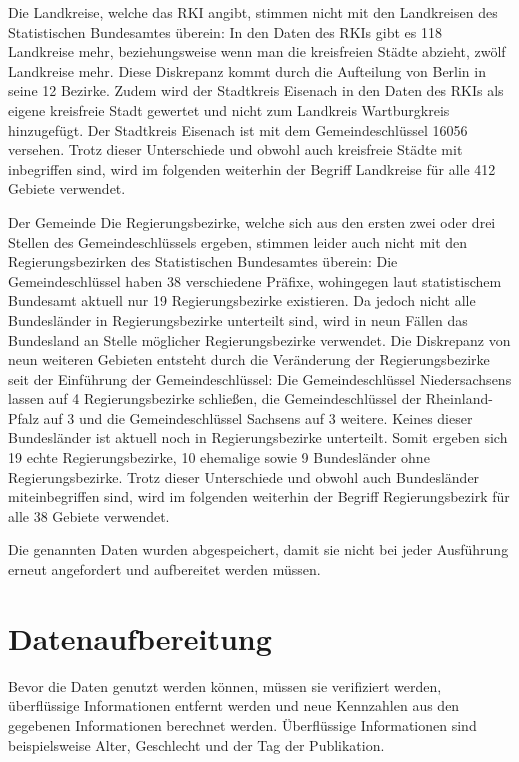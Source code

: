 Die Landkreise, welche das RKI angibt, stimmen nicht mit den Landkreisen des Statistischen Bundesamtes  \autocite{statistischesBundesamtLandkreise}
überein: In den Daten des RKIs gibt es 118 Landkreise mehr, beziehungsweise wenn man die kreisfreien Städte abzieht, zwölf Landkreise mehr. Diese Diskrepanz kommt durch die Aufteilung von Berlin in seine 12 Bezirke. Zudem wird der Stadtkreis Eisenach in den Daten des RKIs als eigene kreisfreie Stadt gewertet und nicht zum Landkreis Wartburgkreis hinzugefügt. Der Stadtkreis Eisenach ist mit dem Gemeindeschlüssel 16056 versehen. Trotz dieser Unterschiede und obwohl auch kreisfreie Städte mit inbegriffen sind, wird im folgenden weiterhin der Begriff \glqq{}Landkreise\grqq{} für alle 412 Gebiete verwendet.

Der Gemeinde
Die Regierungsbezirke, welche sich aus den ersten zwei oder drei Stellen des Gemeindeschlüssels ergeben, stimmen leider auch nicht mit den Regierungsbezirken des Statistischen Bundesamtes
\autocite{statistischesBundesamtRegierungsbezirke}
überein: Die Gemeindeschlüssel haben 38 verschiedene Präfixe, wohingegen laut statistischem Bundesamt aktuell nur 19 Regierungsbezirke existieren.
Da jedoch nicht alle Bundesländer in Regierungsbezirke unterteilt sind, wird in neun Fällen das Bundesland an Stelle möglicher Regierungsbezirke verwendet. Die Diskrepanz von neun weiteren Gebieten entsteht durch die Veränderung der Regierungsbezirke seit der Einführung der Gemeindeschlüssel: Die Gemeindeschlüssel Niedersachsens lassen auf 4 Regierungsbezirke schließen, die Gemeindeschlüssel der Rheinland-Pfalz auf 3 und die Gemeindeschlüssel Sachsens auf 3 weitere. Keines dieser Bundesländer ist aktuell noch in Regierungsbezirke unterteilt. Somit ergeben sich 19 echte Regierungsbezirke, 10 ehemalige sowie 9 Bundesländer ohne Regierungsbezirke.
Trotz dieser Unterschiede und obwohl auch Bundesländer miteinbegriffen sind, wird im folgenden weiterhin der Begriff \glqq{}Regierungsbezirk\grqq{} für alle 38 Gebiete verwendet.

Die genannten Daten wurden abgespeichert, damit sie nicht bei jeder Ausführung erneut angefordert und aufbereitet werden müssen.
\section{Datenaufbereitung}
Bevor die Daten genutzt werden können, müssen sie verifiziert werden, überflüssige Informationen entfernt werden und neue Kennzahlen aus den gegebenen Informationen berechnet werden. Überflüssige Informationen sind beispielsweise Alter, Geschlecht und der Tag der Publikation.

